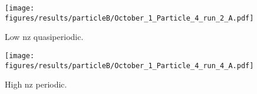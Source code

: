 \begin{figure}[H]
\begin{center}
\texttt{[image: figures/results/particleB/October\_1\_Particle\_4\_run\_2\_A.pdf]}
\end{center}
\caption{Low nz quasiperiodic.}
\label{fig:particleB1}
\end{figure}

\begin{figure}[H]
\begin{center}
\texttt{[image: figures/results/particleB/October\_1\_Particle\_4\_run\_4\_A.pdf]}
\end{center}
\caption{High nz periodic.}
\label{fig:particleB2}
\end{figure}
